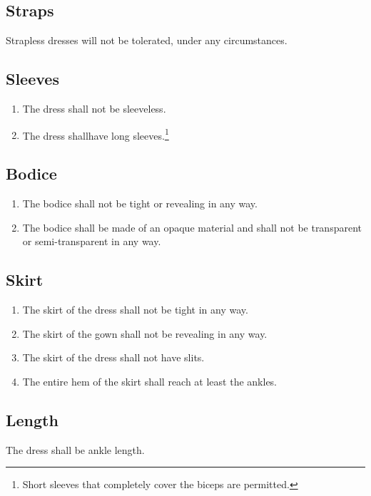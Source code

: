 \documentclass{article}
\begin{document}
\subsection{Straps}

Strapless dresses will not be tolerated, under any circumstances.

\subsection{Sleeves}

\begin{enumerate} 
    \item The dress shall not be sleeveless. 
    \item The dress shallhave long sleeves.\footnote{Short sleeves that 
            completely cover the biceps are permitted.} 
\end{enumerate}

\subsection{Bodice}
\begin{enumerate}
    \item The bodice shall not be tight or revealing in any way.
    \item The bodice shall be made of an opaque material and shall not be
        transparent or semi-transparent in any way.
\end{enumerate}

\subsection{Skirt}

\begin{enumerate}
    \item The skirt of the dress shall not be tight in any way.
    \item The skirt of the gown shall not be revealing in any way.
    \item The skirt of the dress shall not have slits.
    \item The entire hem of the skirt shall reach at least the ankles.
\end{enumerate}

\subsection{Length}

The dress shall be ankle length.
\end{document}
